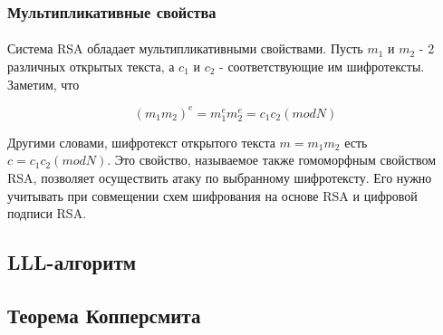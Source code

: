 \subsubsection{Мультипликативные свойства}

  \paragraph{} Система RSA обладает мультипликативными свойствами. Пусть \textit{{$m_1$}} и \textit{{$m_2$}} - 2 различных открытых текста, а \textit{{$c_1$}}
  и \textit{{$c_2$}} - соответствующие им шифротексты. Заметим, что
  
    \begin{equation}
      \textit{{$(m_1 m_2)^e = m_1^e m_2^e = c_1 c_2 (mod N)$}}
    \end{equation}

  Другими словами, шифротекст открытого текста \textit{{$m = m_1 m_2$}} есть \textit{{$c = c_1 c_2 (mod N)$}}. Это свойство, называемое также гомоморфным 
  свойством  RSA, позволяет осуществить атаку по выбранному шифротексту. Его нужно учитывать при совмещении схем шифрования на основе RSA и цифровой подписи
  RSA.

\subsection{LLL-алгоритм}

\subsection{Теорема Копперсмита}
